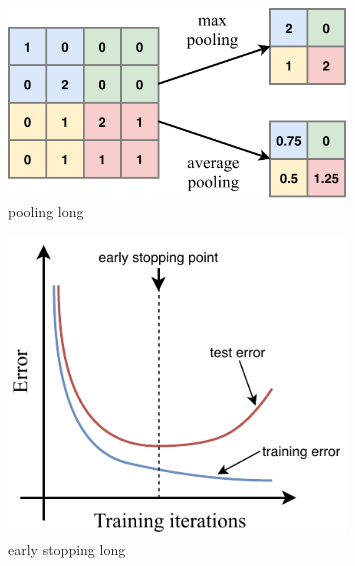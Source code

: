 \begin{figure} %
    \includegraphics[width=0.8\textwidth]{diagrams/6-cvn/pooling.pdf}
    \caption[pooling short]
    {pooling long}
    \label{fig:pooling}
\end{figure} %


\begin{figure} %
    \includegraphics[width=0.8\textwidth]{diagrams/6-cvn/early_stopping.pdf}
    \caption[early stopping short]
    {early stopping long}
    \label{fig:early_stopping}
\end{figure} %


